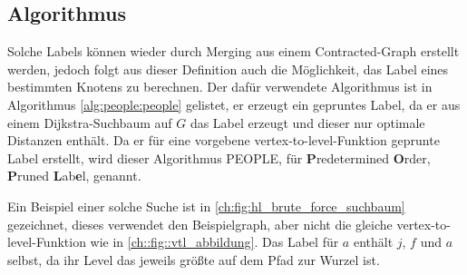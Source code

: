\subsection{Algorithmus}

Solche Labels können wieder durch Merging aus einem Contracted-Graph erstellt werden, jedoch folgt aus dieser Definition auch die Möglichkeit, das Label eines bestimmten Knotens zu berechnen.
Der dafür verwendete Algorithmus ist in Algorithmus \ref{alg:people:people} gelistet, er erzeugt ein gepruntes Label, da er aus einem Dijkstra-Suchbaum auf $G$ das Label erzeugt und dieser nur optimale Distanzen enthält.
Da er für eine vorgebene vertex-to-level-Funktion geprunte Label erstellt, wird dieser Algorithmus PEOPLE, für \textbf{P}redetermined \textbf{O}rder, \textbf{P}runed \textbf{L}ab\textbf{e}l, genannt.

Ein Beispiel einer solche Suche ist in \autoref{ch:fig:hl_brute_force_suchbaum} gezeichnet, dieses verwendet den Beispielgraph, aber nicht die gleiche vertex-to-level-Funktion wie in \autoref{ch::fig::vtl_abbildung}.
Das Label für $a$ enthält $j$, $f$ und $a$ selbst, da ihr Level das jeweils größte auf dem Pfad zur Wurzel ist.

